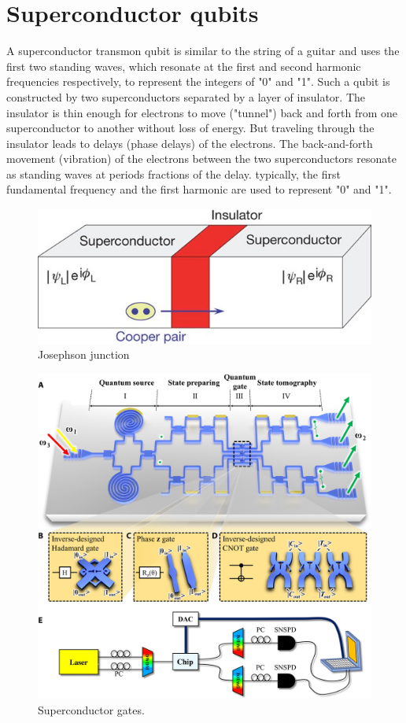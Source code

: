 \documentclass[Letter,11pt]{book}
\begin{document}
\section{Superconductor qubits}
A superconductor transmon qubit is similar to the string of a guitar and uses the first two standing waves, which resonate at the first and second harmonic frequencies respectively, to represent the integers of "0" and "1". Such a qubit is constructed by two superconductors separated by a layer of insulator. The insulator is thin enough for electrons to move ("tunnel") back and forth from one superconductor to another without loss of energy. But traveling through the insulator leads to delays (phase delays) of the electrons. The back-and-forth movement (vibration) of the electrons between the two superconductors resonate as standing waves at periods fractions of the delay. typically, the first fundamental frequency and the first harmonic are used to represent "0" and "1".
\begin{figure}[ht]
\includegraphics[width=12cm]{pic/supercQubit.jpg}
\caption{Josephson junction}
\label{Superconductor}
\end{figure}

\begin{figure}[ht]
\includegraphics[width=12cm]{pic/superGates.jpg}
\caption{Superconductor gates.}
\label{superGates}
\end{figure}
\end{document}
